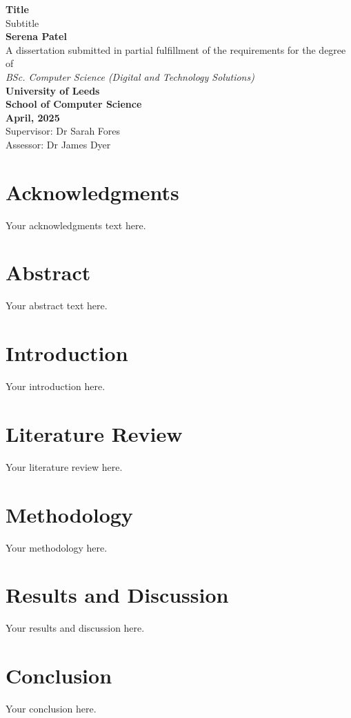 \documentclass[12pt,a4paper]{report}
\begin{document}
\begin{titlepage}
    \begin{center}
        \vspace*{1in}

        {\Huge \textbf{Title}}\\[1cm]
        {\LARGE Subtitle}\\[1.5cm]
        
        \textbf{Serena Patel}\\[1cm]
        A dissertation submitted in partial fulfillment of the requirements for the degree of\\
        \textit{BSc. Computer Science (Digital and Technology Solutions)}\\[0.5cm]
        
        \textbf{University of Leeds}\\[0.5cm]
        \textbf{School of Computer Science}\\[0.5cm]
        
        \textbf{April, 2025}\\[2cm]
        
        Supervisor: Dr Sarah Fores\\
        Assessor: Dr James Dyer

        \vfill
    \end{center}
\end{titlepage}

\chapter*{Acknowledgments}
Your acknowledgments text here.

\chapter*{Abstract}
Your abstract text here.~\cite{Jacobson1999Towards}

\tableofcontents
\newpage

\chapter{Introduction}
Your introduction here.

\chapter{Literature Review}
Your literature review here.

\chapter{Methodology}
Your methodology here.

\chapter{Results and Discussion}
Your results and discussion here.

\chapter{Conclusion}
Your conclusion here.



\end{document}
